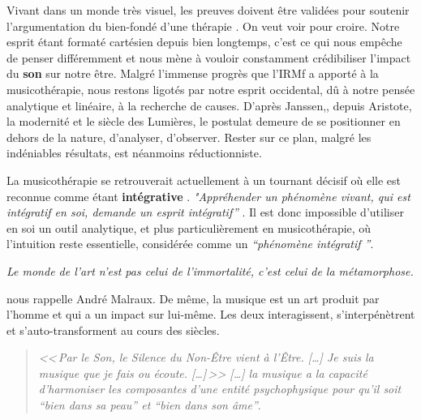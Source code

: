 Vivant dans un monde très visuel, les preuves doivent être
validées pour soutenir l'argumentation du bien-fondé d'une thérapie
\autocite[ch. II, pp. 105--106 ]{vrait_musicotherapie_2018}.
      On veut voir pour croire.
Notre esprit étant formaté cartésien depuis bien longtemps, c'est ce qui nous
empêche de penser différemment
et nous mène à vouloir constamment crédibiliser l'impact
du \textbf{son} sur notre être.
Malgré l'immense progrès que l'IRMf a apporté à la musicothérapie, nous restons
  ligotés par notre esprit occidental, dû à
  notre pensée analytique et linéaire, à la recherche de
  causes.
  D'après Janssen,\autocite[201]{van_eersel_cerveau}, depuis Aristote, la modernité et le
siècle des Lumières, le postulat demeure de se positionner en dehors
de la nature, d'analyser, d'observer.
Rester sur ce plan, malgré les
indéniables résultats, est néanmoins
réductionniste.

La musicothérapie  se retrouverait actuellement
 à un tournant décisif où elle est reconnue comme étant
 \textbf{ intégrative} \autocite[ch. III, p. 53,
 105]{vrait_musicotherapie_2018}.
\textit{"Appréhender un phénomène vivant, qui est intégratif en soi, demande un esprit
  intégratif''} \autocite[201]{van_eersel_cerveau}.
Il est donc impossible d'utiliser en soi un outil analytique, et
plus
particulièrement en musicothérapie, où l'intuition reste essentielle,
considérée comme un \textit{``phénomène intégratif ''}.

\emph{Le monde de
	l'art n'est pas celui de l'immortalité, c'est celui de la
        métamorphose.}

      nous rappelle André Malraux.
      De même, la musique est un art produit par l'homme et qui a un impact
sur lui-même. Les deux interagissent, s'interpénètrent et s'auto-transforment
au cours des siècles.
\begin{quotation}
\emph{<<\,\emph{Par le Son, le Silence du Non-Être vient à l'Être}. [\dots]
\textsl{Je suis}
	\emph{la musique que je fais ou écoute}. [\dots]\,>>
[\ldots] \emph{la musique a la capacité d'harmoniser
les composantes d'une entité psychophysique pour qu'il soit ``bien
dans sa peau'' et ``bien dans son âme}''}.\, \autocite[ch. 1, p.8]{viret:b}
\end{quotation}

